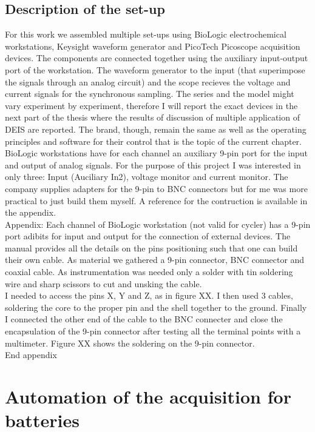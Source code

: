 \subsection{Description of the set-up}
For this work we assembled multiple set-ups using BioLogic electrochemical workstations, Keysight waveform generator and PicoTech Picoscope acquisition devices. The components are connected together using the auxiliary input-output port of the workstation. The waveform generator to the input (that superimpose the signals through an analog circuit) and the scope recieves the voltage and current signals for the synchronous sampling. The series and the model might vary experiment by experiment, therefore I will report the exact devices in the next part of the thesis where the results of discussion of multiple application of DEIS are reported. The brand, though, remain the same as well as the operating principles and software for their control that is the topic of the current chapter.\\
BioLogic workstations have for each channel an auxiliary 9-pin port for the input and output of analog signals. For the purpose of this project I was interested in only three: Input (Auciliary In2), voltage monitor and current monitor. The company supplies adapters for the 9-pin to BNC connectors but for me was more practical to just build them myself. A reference for the contruction is available in the appendix.\\
Appendix: Each channel of BioLogic workstation (not valid for cycler) has a 9-pin port adibits for input and output for the connection of external devices. The manual provides all the details on the pins positioning such that one can build their own cable. As material we gathered a 9-pin connector, BNC connector and coaxial cable. As instrumentation was needed only a solder with tin soldering wire and sharp scissors to cut and unsking the cable.\\
I needed to access the pins X, Y and Z, as in figure XX. I then used 3 cables, soldering the core to the proper pin and the shell together to the ground. Finally I connected the other end of the cable to the BNC connecter and close the encapsulation of the 9-pin connector after testing all the terminal points with a multimeter. Figure XX shows the soldering on the 9-pin connector.\\
End appendix\\
\section{Automation of the acquisition for batteries}
